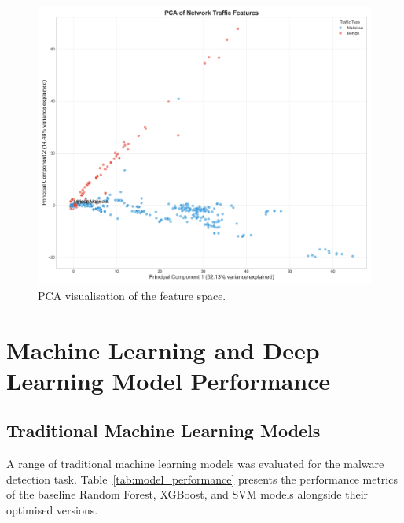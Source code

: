 \begin{figure}[htbp]
    \centering
    \includegraphics[width=\textwidth]{figures/pca_visualization.png}
    \caption{PCA visualisation of the feature space.}
    \label{fig:pca_visualization}
\end{figure} %




\section{Machine Learning and Deep Learning Model Performance}

\subsection{Traditional Machine Learning Models}

A range of traditional machine learning models was evaluated for the malware detection task. Table~\ref{tab:model_performance} presents the performance metrics of the baseline Random Forest, XGBoost, and SVM models alongside their optimised versions.

